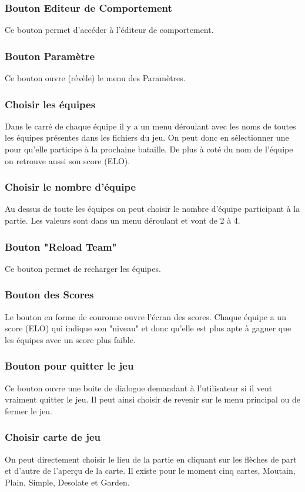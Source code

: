 \documentclass{report}
\begin{document}
\subsubsection{Bouton Editeur de Comportement}
Ce bouton permet d'accéder à l'éditeur de comportement.
\subsubsection{Bouton Paramètre}
Ce bouton ouvre (révèle) le menu des Paramètres.
\subsubsection{Choisir les équipes}
Dans le carré de chaque équipe il y a un menu déroulant avec les noms de toutes les équipes présentes dans les fichiers du jeu. On peut donc en sélectionner une pour qu'elle participe à la prochaine bataille.
De plus à coté du nom de l'équipe on retrouve aussi son score (ELO).
\subsubsection{Choisir le nombre d'équipe}
Au dessus de toute les équipes on peut choisir le nombre d'équipe participant à la partie. Les valeurs sont dans un menu déroulant et vont de 2 à 4.
\subsubsection{Bouton "Reload Team"}
Ce bouton permet de recharger les équipes.
\subsubsection{Bouton des Scores}
Le bouton en forme de couronne ouvre l'écran des scores. Chaque équipe a un score (ELO) qui indique son "niveau" et donc qu'elle est plus apte à gagner que les équipes avec un score plus faible.
\subsubsection{Bouton pour quitter le jeu}
Ce bouton ouvre une boite de dialogue demandant à l'utilisateur si il veut vraiment quitter le jeu. Il peut ainsi choisir de revenir sur le menu principal ou de fermer le jeu.
\subsubsection{Choisir carte de jeu}
On peut directement choisir le lieu de la partie en cliquant sur les flèches de part et d'autre de l’aperçu de la carte. Il existe pour le moment cinq cartes, Moutain, Plain, Simple, Desolate et Garden.
\end{document}
